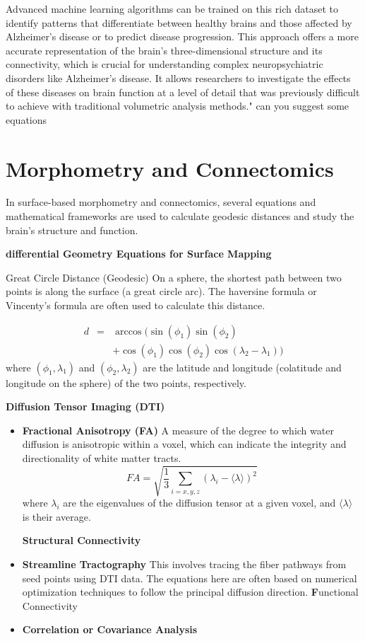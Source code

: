 \documentclass[twocolumn]{article}
\begin{document}
Advanced machine learning algorithms can be trained on this rich dataset to identify patterns that
differentiate between healthy brains and those affected by Alzheimer's disease or to predict disease progression.
This approach offers a more accurate representation of the brain's three-dimensional structure and its connectivity, which is crucial for understanding complex neuropsychiatric disorders like Alzheimer's disease. It allows researchers to investigate the effects of these diseases on brain function at a level of detail that was previously difficult to achieve with traditional volumetric analysis methods." can you suggest some equations
\section{Morphometry and Connectomics}
In surface-based morphometry and connectomics, several equations and mathematical frameworks are used to calculate geodesic distances and study the brain's structure and function. %

\noindent \textbf {differential Geometry Equations for Surface Mapping}

{Great Circle Distance (Geodesic) On a sphere}, the shortest path between two points is along the
surface (a great circle arc). The haversine formula or Vincenty's formula are often used to calculate this distance.

\begin{align}
d &=& \arccos(\sin(\phi_1)\sin(\phi_2) \\
   &&+ \cos(\phi_1)\cos(\phi_2)\cos(\lambda_2 - \lambda_1)) 
\end{align}
where \( (\phi_1, \lambda_1) \) and \( (\phi_2, \lambda_2) \) are the latitude and longitude (colatitude and longitude on the sphere) of the two points, respectively.

\noindent \textbf{Diffusion Tensor Imaging (DTI)}
\begin{itemize}
\item \textbf{Fractional Anisotropy (FA)} A measure of the degree to which water diffusion is anisotropic within a
voxel, which can indicate the integrity and directionality of white matter tracts. \[ FA = \sqrt{\frac{1}{3}\sum_{i=x,y,z}(\lambda_i - \langle\lambda\rangle)^2} \]
where \( \lambda_i \) are the eigenvalues of the diffusion tensor at a given voxel, and \( \langle\lambda\rangle \) is their average.

\noindent \textbf{Structural Connectivity}

\item \textbf{Streamline Tractography} This involves tracing the fiber pathways from seed points using DTI data.
The equations here are often based on numerical optimization techniques to follow the principal diffusion direction.
\noindent \textbf Functional Connectivity
\item \textbf{Correlation or Covariance Analysis} 
\end{itemize}
\end{document}
